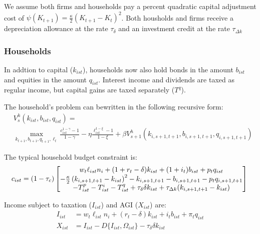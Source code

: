 \documentclass[letterpaper,12pt]{article}
\theoremstyle{definition}
\numberwithin{equation}{section}
\begin{document}
\begin{spacing}{1.5}
    We assume both firms and households pay a percent quadratic capital adjustment cost of $\psi(K_{t+1}) = \tfrac{\kappa}{2} \left(K_{t+1}-K_t\right)^2$.  Both housholds and firms receive a depreciation allowance at the rate $\tau_\delta$ and an investment credit at the rate $\tau_{\Delta k}$

    \subsubsection{Households}
      In addtion to capital ($k_{ist}$), households now also hold bonds in the amount $b_{ist}$ and equities in the amount $q_{ist}$.  Interest income and dividends are taxed as regular income, but capital gains are taxed separately ($T^q$).  

      The household's problem can bewritten in the following recursive form:
      \begin{equation}
      \begin{split}
      & V^h_s(k_{ist},b_{ist},q_{ist}) = \\
      & \max_{k_{t+1},b_{t+1},q_{t+1},\ell_t} \frac{c_{ist}^{1-\gamma}-1}{1-\gamma} - \eta \frac{\ell_{ist}^{1-\xi}-1}{1-\xi} + \beta V^h_{s+1}(k_{i,s+1,t+1},b_{i,s+1,t+1},q_{i,s+1,t+1}) \nonumber
      \end{split}
      \end{equation}
    
      The typical household budget constraint is:
      \begin{equation} \label{Macro_CorpTax_BC}
      c_{ist} = (1-\tau_c)\begin{bmatrix} w_t \ell_{ist} n_i + (1+r_t-\delta)k_{ist} + (1+i_t)b_{ist} + p_t q_{ist} \\
        - \tfrac{\kappa}{2}\left(k_{i,s+1,t+1} - k_{ist}\right)^2 - k_{i,s+1,t+1} - b_{i,s+1,t+1} - p_t q_{i,s+1,t+1} \\
        - T^p_{ist} - T^i_{ist} - T^q_{ist} + \tau_\delta \delta k_{ist} + \tau_{\Delta k} (k_{i,s+1,t+1} - k_{ist}) \end{bmatrix} \\
      \end{equation}

      Income subject to taxation ($I_{ist}$) and AGI ($X_{ist}$) are:
      \begin{align}
      I_{ist} & = w_t \ell_{ist} n_i + (r_t-\delta) k_{ist} + i_t b_{ist} + \pi_t q_{ist} \label{Macro_CorpTax_Income} \\
      X_{ist} & = I_{ist} - D\{I_{ist},\Omega_{ist}\} -\tau_\delta \delta k_{ist} \label{Macro_CorpTax_AGI}
      \end{align}


\end{spacing}
\end{document}
